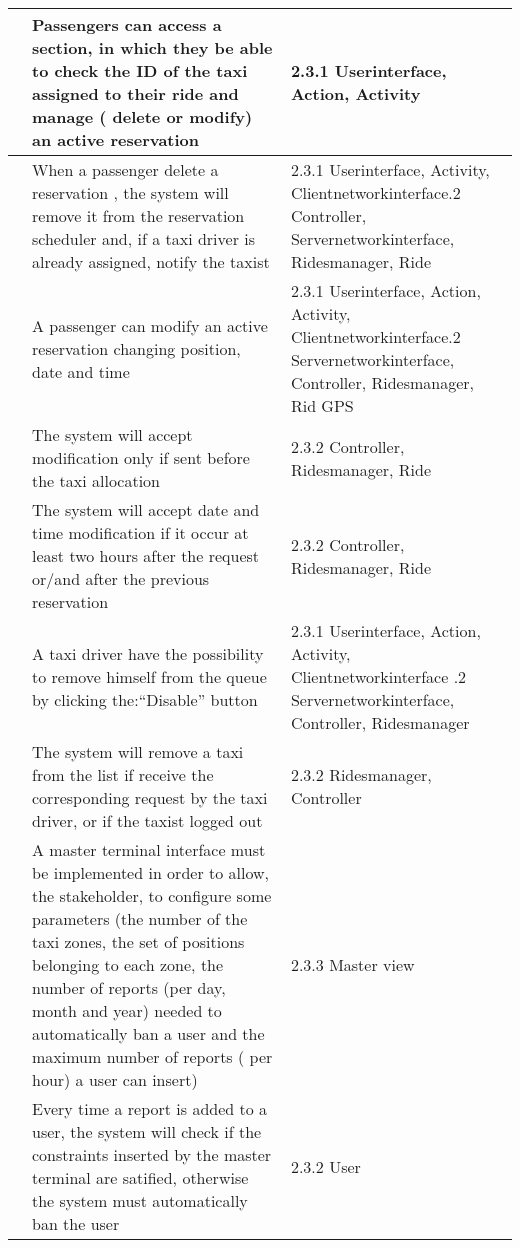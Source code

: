 \begin{center}
\begin{longtable}{| m{2cm} | m{6cm} | m{5cm} | }
      & Passengers can access a section, in which they be able to check the ID of the taxi assigned to their ride 
	and manage ( delete or modify) an active reservation&  2.3.1 Userinterface, Action, Activity\\ \hline
      & When a passenger delete a reservation , the system will remove it from the reservation scheduler and, if a taxi 
	driver is already assigned, notify the taxist& 2.3.1 Userinterface, Activity, Clientnetworkinterface\newline
							2.3.2 Controller, Servernetworkinterface, Ridesmanager, Ride\\ \hline
      & A passenger can modify an active reservation changing position, date and time& 2.3.1 Userinterface, Action, Activity, Clientnetworkinterface\newline
											2.3.2 Servernetworkinterface, Controller, Ridesmanager, Rid \newline
											2.1 GPS\\ \hline
      & The system will accept modification only if sent before the taxi allocation&2.3.2 Controller, Ridesmanager, Ride \\ \hline
      & The system will accept date and time modification if it occur at least two hours after the request or/and after the 
	previous reservation& 2.3.2 Controller, Ridesmanager, Ride\\ \hline
      & A taxi driver have the possibility to remove himself from the queue by clicking the:``Disable'' button& 2.3.1 Userinterface, Action, Activity, Clientnetworkinterface \newline
														 2.3.2 Servernetworkinterface, Controller, Ridesmanager\\ \hline
      & The system will remove a taxi from the list if receive the corresponding request by the taxi driver, or if the taxist logged out& 2.3.2 Ridesmanager, Controller\\ \hline
      &  A master terminal interface must be implemented in order to allow, the stakeholder, to configure some parameters 
	 (the number of the taxi zones, the set of positions belonging to each zone, the number of reports (per day, month and year)
	 needed to automatically ban a user and the maximum number of reports ( per hour) a user can insert)& 2.3.3 Master view\\ \hline
      & Every time a report is added to a user, the system will check if the constraints inserted by the master terminal are satified,
	otherwise the system must automatically ban the user&  2.3.2 User\\ \hline

\end{longtable}
\end{center}
